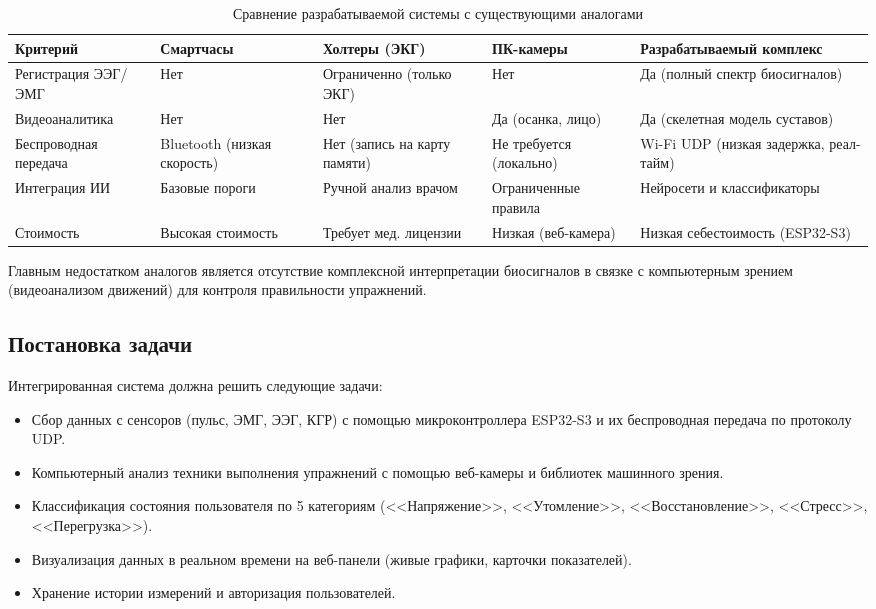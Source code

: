 \documentclass[utf8, russian]{eskdtext}
\begin{document}
\begin{table}[h!tp]
    \centering
    \caption{Сравнение разрабатываемой системы с существующими аналогами}
    \label{tab:competitor_comparison}
    \small
    \begin{tabular}{|P{2.8cm}|P{2.3cm}|P{2.6cm}|P{2.3cm}|P{4.0cm}|}
        \hline
        \textbf{Критерий}         & \textbf{Смарт\-часы}        & \textbf{Хол\-теры (ЭКГ)}     & \textbf{ПК-каме\-ры}    & \textbf{Разраба\-тываемый комплекс}      \\
        \hline
        Регист\-рация ЭЭГ/ЭМГ     & Нет                         & Ограни\-ченно (только ЭКГ)   & Нет                     & Да (полный спектр био\-сиг\-налов)       \\
        \hline
        Видео\-анали\-тика        & Нет                         & Нет                          & Да (осанка, лицо)       & Да (скелет\-ная модель суста\-вов)       \\
        \hline
        Беспро\-водная пере\-дача & Bluetooth (низкая скорость) & Нет (запись на карту памяти) & Не требуется (локально) & Wi-Fi UDP (низкая задерж\-ка, реал-тайм) \\
        \hline
        Интегра\-ция ИИ           & Базовые пороги              & Ручной анализ врачом         & Ограни\-ченные правила  & Нейро\-сети и класси\-фи\-като\-ры       \\
        \hline
        Стои\-мость               & Высокая стоимость           & Требует мед. лицензии        & Низкая (веб-камера)     & Низкая себе\-стои\-мость (ESP32-S3)      \\
        \hline
    \end{tabular}
\end{table}

Главным недостатком аналогов является отсутствие комплексной интерпретации биосигналов в связке с компьютерным зрением (видеоанализом движений) для контроля правильности упражнений.

\subsection{Постановка задачи}
Интегрированная система должна решить следующие задачи:
\begin{itemize}
    \item Сбор данных с сенсоров (пульс, ЭМГ, ЭЭГ, КГР) с помощью микроконтроллера ESP32-S3 и их беспроводная передача по протоколу UDP.
    \item Компьютерный анализ техники выполнения упражнений с помощью веб-камеры и библиотек машинного зрения.
    \item Классификация состояния пользователя по 5 категориям (<<Напряжение>>, <<Утомление>>, <<Восстановление>>, <<Стресс>>, <<Перегрузка>>).
    \item Визуализация данных в реальном времени на веб-панели (живые графики, карточки показателей).
    \item Хранение истории измерений и авторизация пользователей.
\end{itemize}
\end{document}
